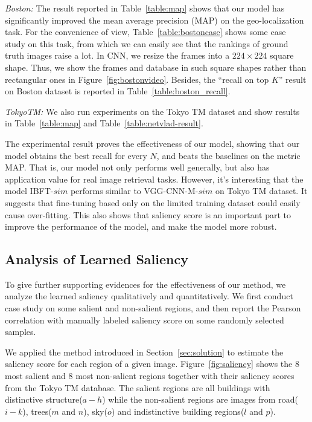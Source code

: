 \emph{Boston: }
The result reported in Table~\ref{table:map} shows that our model has significantly improved the mean average precision (MAP) on the geo-localization task. For the convenience of view, Table~\ref{table:bostoncase} shows some case study on this task, from which we can easily see that the rankings of ground truth images raise a lot. In CNN, we resize the frames into a $224 \times 224$ square shape. Thus, we show the frames and database in such square shapes rather than rectangular ones in Figure~\ref{fig:bostonvideo}. Besides, the ``recall on top $K$'' result on Boston dataset is reported in Table~\ref{table:boston_recall}.

\emph{TokyoTM: }
We also run experiments on the Tokyo TM dataset and show results in Table~\ref{table:map} and Table~\ref{table:netvlad-result}. 

The experimental result proves the effectiveness of our model, showing that our model obtains the best recall for every $N$, and beats the baselines on the metric MAP. That is, our model not only performs well generally, but also has application value for real image retrieval tasks. However, it's interesting that the model IBFT-$sim$ performs  similar to VGG-CNN-M-$sim$ on Tokyo TM dataset. It suggests that fine-tuning based only on the limited training dataset could easily cause over-fitting. This also shows that saliency score is an important part to improve the performance of the model, and make the model more robust.

\subsection{Analysis of Learned Saliency}
To give further supporting evidences for the effectiveness of our method, we analyze the learned saliency qualitatively and quantitatively. 
We first conduct case study on some salient and non-salient regions, and then report the Pearson correlation with manually labeled saliency score on some randomly selected samples.

We applied the method introduced in Section~\ref{sec:solution} to estimate the saliency score for each region of a given image. 
Figure~\ref{fig:saliency} shows the 8 most salient and 8 most non-salient regions together with their saliency scores from the Tokyo TM database. 
The salient regions are all buildings with distinctive structure($a-h$) while the non-salient regions are images from road($i-k$), trees($m$ and $n$), sky($o$) and indistinctive building regions($l$ and $p$). 

